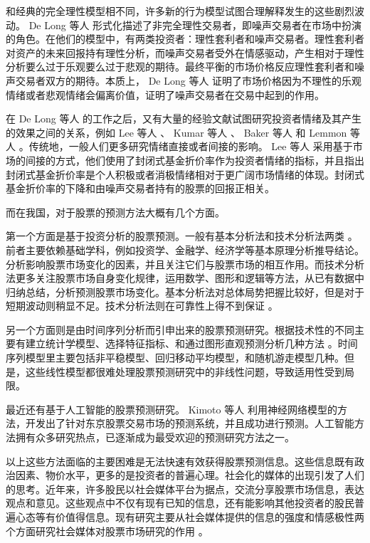 和经典的完全理性模型相不同，许多新的行为模型试图合理解释发生的这些剧烈波动。 De Long 等人 \cite{intro:5} 形式化描述了非完全理性交易者，即噪声交易者在市场中扮演的角色。在他们的模型中，有两类投资者：理性套利者和噪声交易者。理性套利者对资产的未来回报持有理性分析，而噪声交易者受外在情感驱动，产生相对于理性分析要么过于乐观要么过于悲观的期待。最终平衡的市场价格反应理性套利者和噪声交易者双方的期待。本质上， De Long 等人 \cite{intro:5} 证明了市场价格因为不理性的乐观情绪或者悲观情绪会偏离价值，证明了噪声交易者在交易中起到的作用。

在 De Long 等人 \cite{intro:5} 的工作之后，又有大量的经验文献试图研究投资者情绪及其产生的效果之间的关系，例如 Lee 等人 \cite{intro:6} 、 Kumar 等人 \cite{intro:7} 、 Baker 等人 \cite{intro:8} 和 Lemmon 等人 \cite{intro:9} 。传统地，一般人们更多研究情绪直接或者间接的影响。 Lee 等人 \cite{intro:6} 采用基于市场的间接的方式，他们使用了封闭式基金折价率作为投资者情绪的指标，并且指出封闭式基金折价率是个人积极或者消极情绪相对于更广阔市场情绪的体现。封闭式基金折价率的下降和由噪声交易者持有的股票的回报正相关。

而在我国，对于股票的预测方法大概有几个方面。

第一个方面是基于投资分析的股票预测。一般有基本分析法和技术分析法两类 \cite{intro:10} 。前者主要依赖基础学科，例如投资学、金融学、经济学等基本原理分析推导结论。分析影响股票市场变化的因素，并且关注它们与股票市场的相互作用。而技术分析法更多关注股票市场自身变化规律，运用数学、图形和逻辑等方法，从已有数据中归纳总结，分析预测股票市场变化。基本分析法对总体局势把握比较好，但是对于短期波动则稍显不足。技术分析法则在可靠性上得不到保证 \cite{intro:11} 。

另一个方面则是由时间序列分析而引申出来的股票预测研究。根据技术性的不同主要有建立统计学模型、选择特征指标、和通过图形直观预测分析几种方法 \cite{intro:12}\cite{intro:13} 。时间序列模型里主要包括非平稳模型、回归移动平均模型，和随机游走模型几种。但是，这些线性模型都很难处理股票预测研究中的非线性问题，导致适用性受到局限。

最近还有基于人工智能的股票预测研究。 Kimoto 等人 \cite{intro:14} 利用神经网络模型的方法，开发出了针对东京股票交易市场的预测系统，并且成功进行预测。人工智能方法拥有众多研究热点，已逐渐成为最受欢迎的预测研究方法之一。

以上这些方法面临的主要困难是无法快速有效获得股票预测信息。这些信息既有政治因素、物价水平，更多的是投资者的普遍心理。社会化的媒体的出现引发了人们的思考。近年来，许多股民以社会媒体平台为据点，交流分享股票市场信息，表达观点和意见。这些观点中不仅有现有已知的信息，还有能影响其他投资者的股民普遍心态等有价值得信息。现有研究主要从社会媒体提供的信息的强度和情感极性两个方面研究社会媒体对股票市场研究的作用 \cite{intro:15} 。

